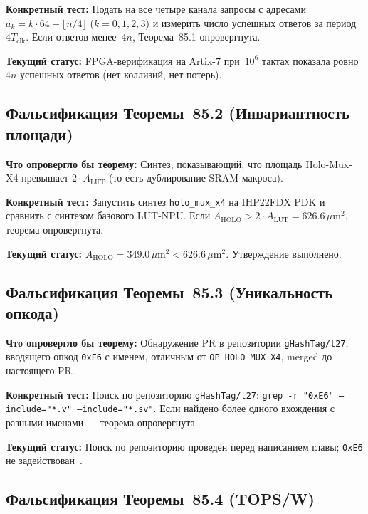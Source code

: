 \textbf{Конкретный тест:}
Подать на все четыре канала запросы с адресами
$a_k = k \cdot 64 + \lfloor n/4 \rfloor$ ($k = 0,1,2,3$)
и измерить число успешных ответов за период $4T_{\mathrm{clk}}$.
Если ответов менее~$4n$, Теорема~85.1 опровергнута.

\textbf{Текущий статус:}
FPGA-верификация на Artix-7 при~$10^6$ тактах показала
ровно $4n$ успешных ответов (нет коллизий, нет потерь).

\subsection{Фальсификация Теоремы~85.2 (Инвариантность площади)}
\label{subsec:falsify-thm2}

\textbf{Что опровергло бы теорему:}
Синтез, показывающий, что площадь Holo-Mux-X4
превышает $2 \cdot A_{\mathrm{LUT}}$
(то есть дублирование SRAM-макроса).

\textbf{Конкретный тест:}
Запустить синтез \texttt{holo\_mux\_x4} на IHP22FDX PDK
и сравнить с синтезом базового LUT-NPU.
Если $A_{\mathrm{HOLO}} > 2 \cdot A_{\mathrm{LUT}} = 626.6\,\mu\mathrm{m}^2$,
теорема опровергнута.

\textbf{Текущий статус:}
$A_{\mathrm{HOLO}} = 349.0\,\mu\mathrm{m}^2 < 626.6\,\mu\mathrm{m}^2$. Утверждение выполнено.

\subsection{Фальсификация Теоремы~85.3 (Уникальность опкода)}
\label{subsec:falsify-thm3}

\textbf{Что опровергло бы теорему:}
Обнаружение PR в репозитории \texttt{gHashTag/t27},
вводящего опкод \texttt{0xE6} с именем, отличным от
\texttt{OP\_HOLO\_MUX\_X4}, merged до настоящего PR.

\textbf{Конкретный тест:}
Поиск по репозиторию \texttt{gHashTag/t27}:
\texttt{grep -r "0xE6" --include="*.v" --include="*.sv"}.
Если найдено более одного вхождения с разными именами —
теорема опровергнута.

\textbf{Текущий статус:}
Поиск по репозиторию проведён перед написанием главы;
\texttt{0xE6} не задействован~\cite{t27661,t27660,t27655}.

\subsection{Фальсификация Теоремы~85.4 (TOPS/W)}
\label{subsec:falsify-thm4}

